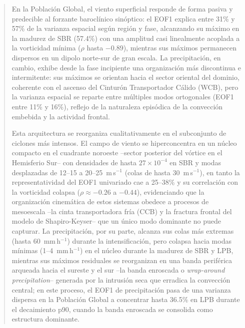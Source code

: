 \begin{abstract}
En la Población Global, el viento superficial responde de forma pasiva y predecible al forzante baroclínico sinóptico: el EOF1 explica entre 31\% y 57\% de la varianza espacial según región y fase, alcanzando su máximo en la madurez de SBR (57.4\%) con una amplitud casi linealmente acoplada a la vorticidad mínima ($\rho$ hasta $-0.89$), mientras sus máximos permanecen dispersos en un dipolo norte-sur de gran escala. La precipitación, en cambio, exhibe desde la fase incipiente una organización más discontinua e intermitente: sus máximos se orientan hacia el sector oriental del dominio, coherente con el ascenso del Cinturón Transportador Cálido (WCB), pero la varianza espacial se reparte entre múltiples modos ortogonales (EOF1 entre 11\% y 16\%), reflejo de la naturaleza episódica de la convección embebida y la actividad frontal.

Esta arquitectura se reorganiza cualitativamente en el subconjunto de ciclones más intensos. El campo de viento se hiperconcentra en un núcleo compacto en el cuadrante noroeste --sector posterior del vórtice en el Hemisferio Sur-- con densidades de hasta $27\times10^{-4}$ en SBR y modas desplazadas de 12--15 a 20--25~m\,s$^{-1}$ (colas de hasta 30~m\,s$^{-1}$), en tanto la representatividad del EOF1 univariado cae a 25--38\% y su correlación con la vorticidad colapsa ($\rho \approx -0.26$ a $-0.44$), evidenciando que la organización cinemática de estos sistemas obedece a procesos de mesoescala --la cinta transportadora fría (CCB) y la fractura frontal del modelo de Shapiro-Keyser-- que un único modo dominante no puede capturar. La precipitación, por su parte, alcanza sus colas más extremas (hasta 60~mm\,h$^{-1}$) durante la intensificación, pero colapsa hacia modas mínimas (1--4~mm\,h$^{-1}$) en el núcleo durante la madurez de SBR y LPB, mientras sus máximos residuales se reorganizan en una banda periférica arqueada hacia el sureste y el sur --la banda enroscada o \textit{wrap-around precipitation}-- generada por la intrusión seca que erradica la convección central; en este proceso, el EOF1 de precipitación pasa de una varianza dispersa en la Población Global a concentrar hasta 36.5\% en LPB durante el decaimiento p90, cuando la banda enroscada se consolida como estructura dominante.


\end{abstract}
